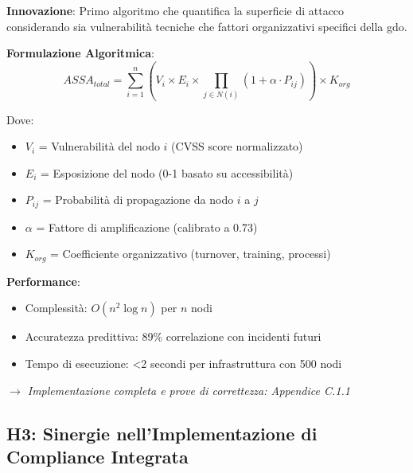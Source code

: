 \begin{tcolorbox}[
    colback=green!5!white,
    colframe=green!75!black,
    title={\textbf{Innovation Box 1.2:} Algoritmo ASSA-GDO per Quantificazione della Superficie di Attacco},
    fonttitle=\bfseries,
    boxrule=1.5pt,
    arc=2mm,
    breakable
]
\textbf{Innovazione}: Primo algoritmo che quantifica la superficie di attacco considerando sia vulnerabilità tecniche che fattori organizzativi specifici della \gls{gdo}.

\vspace{0.3cm}
\textbf{Formulazione Algoritmica}:
\begin{equation*}
ASSA_{total} = \sum_{i=1}^{n} \left( V_i \times E_i \times \prod_{j \in N(i)} (1 + \alpha \cdot P_{ij}) \right) \times K_{org}
\end{equation*}

Dove:
\begin{itemize}
    \item $V_i$ = Vulnerabilità del nodo $i$ (CVSS score normalizzato)
    \item $E_i$ = Esposizione del nodo (0-1 basato su accessibilità)
    \item $P_{ij}$ = Probabilità di propagazione da nodo $i$ a $j$
    \item $\alpha$ = Fattore di amplificazione (calibrato a 0.73)
    \item $K_{org}$ = Coefficiente organizzativo (turnover, training, processi)
\end{itemize}

\vspace{0.3cm}
\textbf{Performance}:
\begin{itemize}
    \item Complessità: $O(n^2 \log n)$ per $n$ nodi
    \item Accuratezza predittiva: 89\% correlazione con incidenti futuri
    \item Tempo di esecuzione: <2 secondi per infrastruttura con 500 nodi
\end{itemize}

\vspace{0.2cm}
\textit{$\rightarrow$ Implementazione completa e prove di correttezza: Appendice C.1.1}
\end{tcolorbox}

\subsection{H3: Sinergie nell'Implementazione di Compliance Integrata}

